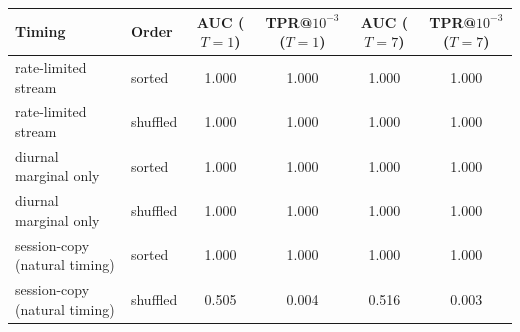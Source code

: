\begin{tabular}{llcccc}
\toprule
Timing & Order & AUC ($T{=}1$) & TPR@$10^{-3}$ ($T{=}1$) & AUC ($T{=}7$) & TPR@$10^{-3}$ ($T{=}7$)\\
\midrule
rate-limited stream & sorted & 1.000 & 1.000 & 1.000 & 1.000\\
rate-limited stream & shuffled & 1.000 & 1.000 & 1.000 & 1.000\\
\midrule
diurnal marginal only & sorted & 1.000 & 1.000 & 1.000 & 1.000\\
diurnal marginal only & shuffled & 1.000 & 1.000 & 1.000 & 1.000\\
\midrule
session-copy (natural timing) & sorted & 1.000 & 1.000 & 1.000 & 1.000\\
session-copy (natural timing) & shuffled & 0.505 & 0.004 & 0.516 & 0.003\\
\bottomrule
\end{tabular}
